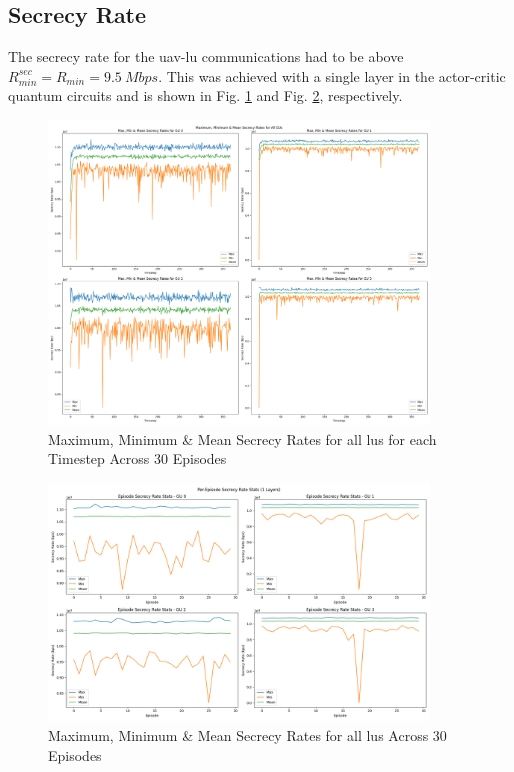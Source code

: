 \subsection{Secrecy Rate}
The secrecy rate for the \acrshort{uav}-\acrshort{lu} communications had to be above $R_{min}^{sec} = R_{min} = 9.5\ Mbps$. 
This was achieved with a single layer in the actor-critic quantum circuits and is shown in Fig. \ref{fig:timestep_secrecy_rate_all_gus} and Fig. \ref{fig:episode_secrecy_rate}, respectively. 

\begin{figure} [ht!]
    \centering
    \includegraphics[width=0.9\textwidth]{figures/plots_eve_outputs/test3/1_timestep_secrecy_rate_all_GUs.png}
    \caption{Maximum, Minimum \& Mean Secrecy Rates for all \acrshort{lu}s for each Timestep Across 30 Episodes}
    \label{fig:timestep_secrecy_rate_all_gus}
\end{figure}

\begin{figure} [ht!]
    \centering
    \includegraphics[width=0.9\textwidth]{figures/plots_eve_outputs/test3/1_episode_secrecy_rate_stats.png}
    \caption{Maximum, Minimum \& Mean Secrecy Rates for all \acrshort{lu}s Across 30 Episodes}
    \label{fig:episode_secrecy_rate}
\end{figure}

